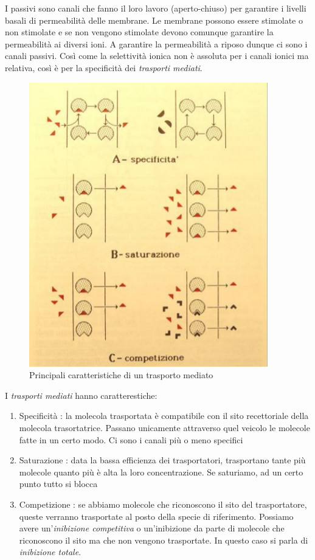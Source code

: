 \documentclass[a4paper,12pt]{article}
\begin{document}
I passivi sono canali che fanno il loro
lavoro (aperto-chiuso) per garantire i
livelli basali di permeabilità delle
membrane. Le membrane possono
essere stimolate o non stimolate e se
non vengono stimolate devono comunque garantire la permeabilità ai
diversi ioni. A garantire la permeabilità a riposo dunque ci sono i canali
passivi.
Così come la selettività ionica non è
assoluta per i canali ionici ma relativa,
così è per la specificità dei \emph{trasporti
mediati}.

\begin{figure}[H]
\centering
\includegraphics[scale=0.35]{immagine/carrier.jpg}
\caption{Principali caratteristiche di un trasporto mediato}
\end{figure}

I \emph{trasporti mediati} hanno caratterestiche:
\begin{enumerate}
\item{Specificità : la molecola trasportata è compatibile con il sito recettoriale della molecola trasortatrice. Passano unicamente attraverso quel veicolo le molecole fatte in un certo modo. Ci sono i canali più o meno specifici}
\item{Saturazione :  data la bassa efficienza dei trasportatori, trasportano tante più molecole quanto più è alta la loro concentrazione. Se saturiamo, ad un certo punto tutto si blocca}
\item{Competizione : se abbiamo molecole che riconoscono il sito del trasportatore, queste verranno trasportate al posto della specie di riferimento. Possiamo avere un'\emph{inibizione competitiva} o un’inibizione da parte di molecole che riconoscono il sito ma che non vengono trasportate. In questo caso si parla di \emph{inibizione totale}.}
\end{enumerate}
\end{document}
